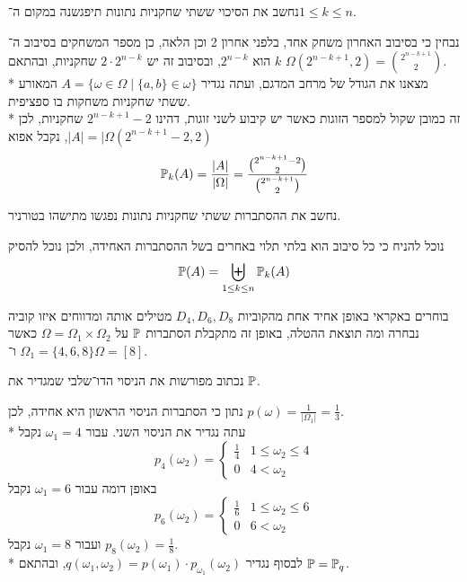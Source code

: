 \Subquestion{}
נחשב את הסיכוי ששתי שחקניות נתונות תיפגשנה במקום ה־$1 \le k \le n$.
\begin{solution}
	נבחין כי בסיבוב האחרון משחק אחד, בלפני אחרון 2 וכן הלאה, כן מספר המשחקים בסיבוב ה־$k$ הוא $2^{n - k}$, ובסיבוב זה יש $2 \cdot 2^{n - k}$ שחקניות, ובהתאם $\Omega(2^{n - k + 1}, 2) = \binom{2^{n - k + 1}}{2}$. \\*
	מצאנו את הגודל של מרחב המדגם, ועתה נגדיר $A = \{ \omega \in \Omega \mid \{ a, b \} \in \omega \}$ המאורע ששתי שחקניות משחקות בו ספציפית. \\*
	זה כמובן שקול למספר הזוגות כאשר יש קיבוע לשני זוגות, דהינו $2^{n - k + 1} - 2$ שחקניות, לכן $|A| = |\Omega(2^{n - k + 1} - 2, 2)$, נקבל אפוא
	\[
		\mathbb{P}_k(A) = \frac{|A|}{|\Omega|} = \frac{\binom{2^{n - k + 1} - 2}{2}}{\binom{2^{n - k + 1}}{2}}
	\]
\end{solution}

\Subquestion{}
נחשב את ההסתברות ששתי שחקניות נתונות נפגשו מתישהו בטורניר.
\begin{solution}
	נוכל להניח כי כל סיבוב הוא בלתי תלוי באחרים בשל ההסתברות האחידה, ולכן נוכל להסיק
	\[
		\mathbb{P}(A) = \biguplus_{1 \le k \le n} \mathbb{P}_k(A)
	\]
\end{solution}

\Question{}
בוחרים באקראי באופן אחיד אחת מהקוביות $D_4, D_6, D_8$ מטילים אותה ומדווחים איזו קוביה נבחרה ומה תוצאת ההטלה, באופן זה מתקבלת הסתברות $\mathbb{P}$ על $\Omega = \Omega_1 \times \Omega_2$ כאשר $\Omega_1 = \{ 4, 6, 8 \}$ ו־$\Omega = [8]$.

\Subquestion{}
נכתוב מפורשות את הניסוי הדו־שלבי שמגדיר את $\mathbb{P}$.
\begin{solution}
	נתון כי הסתברות הניסוי הראשון היא אחידה, לכן $p(\omega) = \frac{1}{|\Omega_1|} = \frac{1}{3}$. \\*
	עתה נגדיר את הניסוי השני.
	עבור $\omega_1 = 4$ נקבל
	\[
		p_4(\omega_2) = \begin{cases}
			\frac{1}{4} & 1 \le \omega_2 \le 4 \\
			0 & 4 < \omega_2
		\end{cases}
	\]
	באופן דומה עבור $\omega_1 = 6$ נקבל
	\[
		p_6(\omega_2) = \begin{cases}
			\frac{1}{6} & 1 \le \omega_2 \le 6 \\
			0 & 6 < \omega_2
		\end{cases}
	\]
	ועבור $\omega_1 = 8$ נקבל $p_8(\omega_2) = \frac{1}{8}$. \\*
	לבסוף נגדיר $q(\omega_1, \omega_2) = p(\omega_1) \cdot p_{\omega_1}(\omega_2)$, ובהתאם $\mathbb{P} = \mathbb{P}_q$.
\end{solution}

